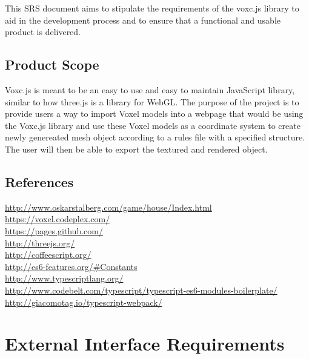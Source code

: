 \documentclass[english]{article}
\begin{document}
		This SRS document aims to stipulate the requirements of the voxc.js library to aid in the development process and to ensure that a functional and usable product is delivered.
		
		\subsection{Product Scope}
		
		Voxc.js is meant to be an easy to use and easy to maintain JavaScript library, similar to how three.js is a library for WebGL. The purpose of the project is to provide users a way to import Voxel models into a webpage that would be using the Voxc.js library and use these Voxel models as a coordinate system to create newly genereated mesh object according to a rules file with a specified structure. The user will then be able to export the textured and rendered object.
		
		\subsection{References}
		
		\color{blue}
		\url{http://www.oskarstalberg.com/game/house/Index.html}
		\newline
		\\\url{https://voxel.codeplex.com/}
		\newline
		\\\url{https://pages.github.com/}
		\newline
		\\\url{http://threejs.org/}
		\newline
		\\\url{http://coffeescript.org/}
		\newline
		\\\url{http://es6-features.org/#Constants}
		\newline
		\\\url{http://www.typescriptlang.org/}
		\newline
		\\\url{http://www.codebelt.com/typescript/typescript-es6-modules-boilerplate/}
		\newline
		\\\url{http://giacomotag.io/typescript-webpack/}
		\color{black}
		
	\pagebreak
	
	\section{External Interface Requirements}
	
\end{document}
